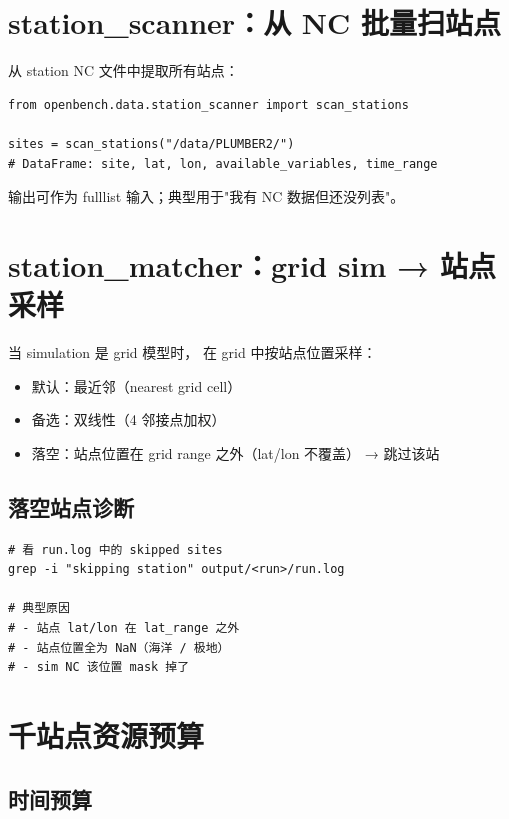 \section{station\_scanner：从 NC 批量扫站点}

 从 station NC 文件中提取所有站点：

\begin{verbatim}
from openbench.data.station_scanner import scan_stations

sites = scan_stations("/data/PLUMBER2/")
# DataFrame: site, lat, lon, available_variables, time_range
\end{verbatim}

输出可作为 fulllist 输入；典型用于"我有 NC 数据但还没列表"。

\section{station\_matcher：grid sim → 站点采样}

当 simulation 是 grid 模型时， 在 grid 中按站点位置采样：

\begin{itemize}
  \item 默认：最近邻（nearest grid cell）
  \item 备选：双线性（4 邻接点加权）
  \item 落空：站点位置在 grid range 之外（lat/lon 不覆盖） → 跳过该站
\end{itemize}

\subsection{落空站点诊断}

\begin{verbatim}
# 看 run.log 中的 skipped sites
grep -i "skipping station" output/<run>/run.log

# 典型原因
# - 站点 lat/lon 在 lat_range 之外
# - 站点位置全为 NaN（海洋 / 极地）
# - sim NC 该位置 mask 掉了
\end{verbatim}

\section{千站点资源预算}

\subsection{时间预算}

